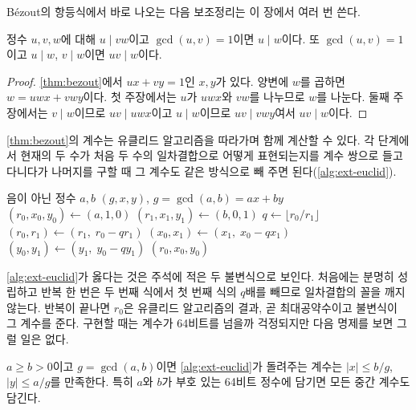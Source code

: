 Bézout의 항등식에서 바로 나오는 다음 보조정리는 이 장에서 여러 번 쓴다.

\begin{lemma}[Euclid]
\label{lem:euclid}
정수 $u,v,w$에 대해 $u\mid vw$이고 $\gcd(u,v)=1$이면 $u\mid w$이다. 또 $\gcd(u,v)=1$이고 $u\mid w$, $v\mid w$이면 $uv\mid w$이다.
\end{lemma}

\begin{proof}
\cref{thm:bezout}에서 $ux+vy=1$인 $x,y$가 있다. 양변에 $w$를 곱하면 $w=uwx+vwy$이다. 첫 주장에서는 $u$가 $uwx$와 $vw$를 나누므로 $w$를 나눈다. 둘째 주장에서는 $v\mid w$이므로 $uv\mid uwx$이고 $u\mid w$이므로 $uv\mid vwy$여서 $uv\mid w$이다.
\end{proof}

\cref{thm:bezout}의 계수는 유클리드 알고리즘을 따라가며 함께 계산할 수 있다. 각 단계에서 현재의 두 수가 처음 두 수의 일차결합으로 어떻게 표현되는지를 계수 쌍으로 들고 다니다가 나머지를 구할 때 그 계수도 같은 방식으로 빼 주면 된다(\cref{alg:ext-euclid}).

\begin{algorithm}[htbp]
\begin{algorithmic}[1]
\Require 음이 아닌 정수 $a,b$
\Ensure $(g,x,y)$, $g=\gcd(a,b)=ax+by$
\State $(r_0,x_0,y_0)\gets(a,1,0)$ 
\State $(r_1,x_1,y_1)\gets(b,0,1)$ 
  \State $q\gets\lfloor r_0/r_1\rfloor$
  \State $(r_0,r_1)\gets(r_1,\;r_0-qr_1)$
  \State $(x_0,x_1)\gets(x_1,\;x_0-qx_1)$
  \State $(y_0,y_1)\gets(y_1,\;y_0-qy_1)$ 
\EndWhile
\State \Return $(r_0,x_0,y_0)$
\end{algorithmic}
\caption{확장 유클리드 알고리즘}
\label{alg:ext-euclid}
\end{algorithm}

\cref{alg:ext-euclid}가 옳다는 것은 주석에 적은 두 불변식으로 보인다. 처음에는 분명히 성립하고 반복 한 번은 두 번째 식에서 첫 번째 식의 $q$배를 빼므로 일차결합의 꼴을 깨지 않는다. 반복이 끝나면 $r_0$은 유클리드 알고리즘의 결과, 곧 최대공약수이고 불변식이 그 계수를 준다. 구현할 때는 계수가 64비트를 넘을까 걱정되지만 다음 명제를 보면 그럴 일은 없다.

\begin{proposition}
\label{prop:bezout-size}
$a\ge b>0$이고 $g=\gcd(a,b)$이면 \cref{alg:ext-euclid}가 돌려주는 계수는 $|x|\le b/g$, $|y|\le a/g$를 만족한다. 특히 $a$와 $b$가 부호 있는 64비트 정수에 담기면 모든 중간 계수도 담긴다.
\end{proposition}


